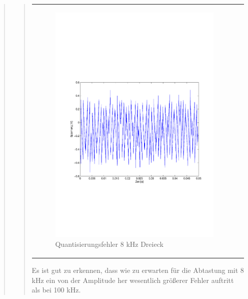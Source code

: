 \begin{quote}
\begin{quote}
\begin{center}
\begin{tabular}{ll}
                \begin{minipage}{0.6\textwidth}
                    \begin{figure}[H]
                        \includegraphics[scale=0.5, trim = 16mm 70mm 16mm 85mm, clip]
                                        {Bilder/8kHz_dreieck_Quantisierungsfehler}
                        \caption{Quantisierungsfehler 8 kHz Dreieck}
                        \label{fig:QuantErr 8 kHz Dreieck}
                    \end{figure}
                \end{minipage}
            
            \end{tabular}
        \end{center}
        \vspace{2em}
        
        Es ist gut zu erkennen, dass wie zu erwarten für die Abtastung mit 8 kHz ein von der Amplitude her wesentlich
        größerer Fehler auftritt als bei 100 kHz.
         

\end{quote}
\end{quote}

